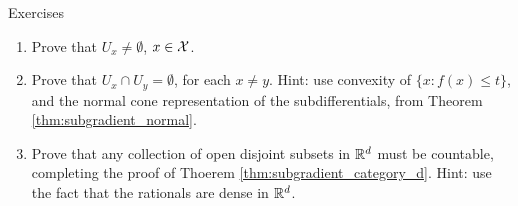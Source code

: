 \begin{xcb}{Exercises}
\begin{enumerate}[label=\thechapter.\arabic*]
\begin{enumerate}[label=\alph*.]
\item Prove that $U_x \not= \emptyset$, $x \in \mathcal{X}$.

\item Prove that $U_x \cap U_y = \emptyset$, for each $x \not= y$. Hint: use
  convexity of $\{x : f(x) \leq t\}$, and the normal cone representation of the 
  subdifferentials, from Theorem \ref{thm:subgradient_normal}.    

\item Prove that any collection of open disjoint subsets in $\mathbb{R}^d$ must be 
  countable, completing the proof of Thoerem
  \ref{thm:subgradient_category_d}. Hint: use the fact that the rationals are
  dense in $\mathbb{R}^d$.
\end{enumerate}

\end{enumerate}
\end{xcb}